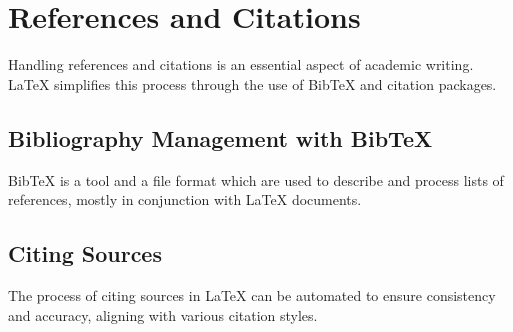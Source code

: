 \section{References and Citations}
\label{sec:references-citations}

Handling references and citations is an essential aspect of academic writing. LaTeX simplifies this process through the use of BibTeX and citation packages.

\subsection{Bibliography Management with BibTeX}
BibTeX is a tool and a file format which are used to describe and process lists of references, mostly in conjunction with LaTeX documents.

\subsection{Citing Sources}
The process of citing sources in LaTeX can be automated to ensure consistency and accuracy, aligning with various citation styles.
